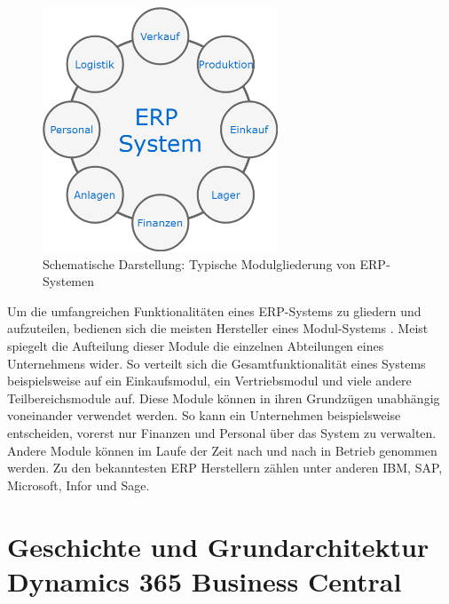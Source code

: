 \pagebreak

\begin{figure}[h]
	\centering
	\includegraphics[width=70mm]{images/ERPModules.png}
	\caption{Schematische Darstellung: Typische Modulgliederung von ERP-Systemen}
	\label{fig:Modulisierung}
\end{figure}

Um die umfangreichen Funktionalitäten eines ERP-Systems zu gliedern und aufzuteilen, bedienen sich die meisten Hersteller eines Modul-Systems \cite{studebaker2007programming}. Meist spiegelt die Aufteilung dieser Module die einzelnen Abteilungen eines Unternehmens wider. So verteilt sich die Gesamtfunktionalität eines Systems beispielsweise auf ein Einkaufsmodul, ein Vertriebsmodul und viele andere Teilbereichsmodule auf. 
Diese Module können in ihren Grundzügen unabhängig voneinander verwendet werden. So kann ein Unternehmen beispielsweise entscheiden, vorerst nur Finanzen und Personal über das System zu verwalten. Andere Module können im Laufe der Zeit nach und nach in Betrieb genommen werden. Zu den bekanntesten ERP Herstellern zählen unter anderen IBM, SAP, Microsoft, Infor und Sage.

\pagebreak
\section{Geschichte und Grundarchitektur Dynamics 365 Business Central}
\label{sec:Grundarchitektur Dynamics 365 Business Central}

